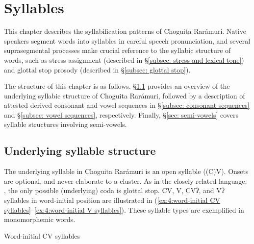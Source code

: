 \chapter{Syllables}
\label{chap: syllables}

This chapter describes the syllabification patterns of Choguita Rarámuri. Native speakers segment words into syllables in careful speech pronunciation, and several suprasegmental processes make crucial reference to the syllabic structure of words, such as stress assignment (described in §\ref{subsec: stress and lexical tone}) and glottal stop prosody (described in §\ref{subsec: glottal stop}).

The structure of this chapter is as follows. §\ref{subsec: underlying syllable structure} provides an overview of the underlying syllabic structure of Choguita Rarámuri, followed by a description of attested derived consonant and vowel sequences in §\ref{subsec: consonant sequences} and §\ref{subsec: vowel sequences}, respectively. Finally, §\ref{sec: semi-vowels} covers syllable structures involving semi-vowels.

\section{Underlying syllable structure}
\label{subsec: underlying syllable structure}

The underlying syllable in Choguita Rarámuri is an open syllable ((C)V). Onsets are optional, and never elaborate to a cluster. As in the closely related  language,  \parencite{miller1996guarijio}, the only possible (underlying) coda is glottal stop. CV, V, CVʔ, and Vʔ syllables in word-initial position are illustrated in (\ref{ex:4:word-initial CV syllables}--\ref{ex:4:word-initial V syllables}). These syllable types are exemplified in monomorphemic words.

\ea\label{ex:4:word-initial CV syllables}
{Word-initial CV syllables}

    \z
\z

